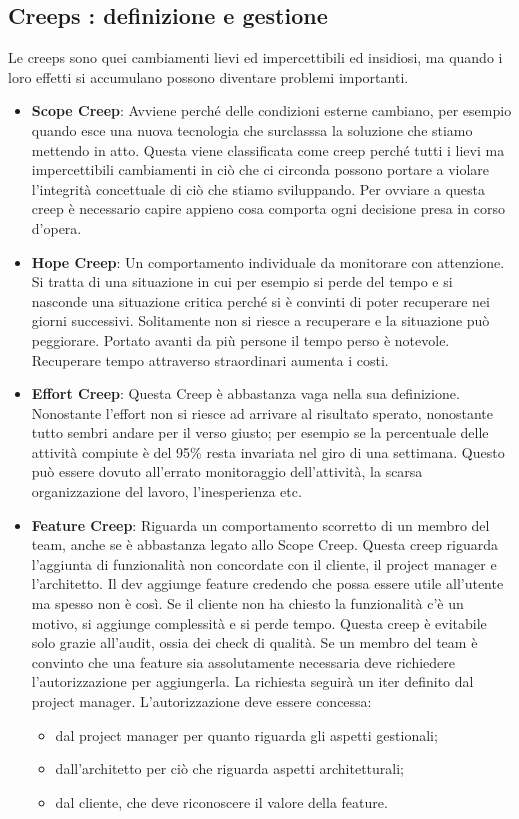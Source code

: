 \subsection{Creeps : definizione e gestione}
Le creeps sono quei cambiamenti lievi ed impercettibili ed insidiosi, ma quando i loro effetti si accumulano possono diventare problemi importanti.
\begin{itemize}
	\item \textbf{Scope Creep}: Avviene perché delle condizioni esterne cambiano, per esempio quando esce una nuova tecnologia che surclasssa la soluzione che stiamo mettendo in atto. Questa viene classificata come creep perché tutti i lievi ma impercettibili cambiamenti in ciò che ci circonda possono portare a violare l'integrità concettuale di ciò che stiamo sviluppando. Per ovviare a questa creep è necessario capire appieno cosa comporta ogni decisione presa in corso d'opera.
	\item \textbf{Hope Creep}: Un comportamento individuale da monitorare con attenzione. Si tratta di una situazione in cui per esempio si perde del tempo e si nasconde una situazione critica perché si è convinti di poter recuperare nei giorni successivi. Solitamente non si riesce a recuperare e la situazione può peggiorare. Portato avanti da più persone il tempo perso è notevole. Recuperare tempo attraverso straordinari aumenta i costi.
	\item \textbf{Effort Creep}: Questa Creep è abbastanza vaga nella sua definizione. Nonostante l'effort non si riesce ad arrivare al risultato sperato, nonostante tutto sembri andare per il verso giusto; per esempio se la percentuale delle attività compiute è del 95\% resta invariata nel giro di una settimana. Questo può essere dovuto all'errato monitoraggio dell'attività, la scarsa organizzazione del lavoro, l'inesperienza etc.
	\item \textbf{Feature Creep}: Riguarda un comportamento scorretto di un membro del team, anche se è abbastanza legato allo Scope Creep. Questa creep riguarda l'aggiunta di funzionalità non concordate con il cliente, il project manager e l'architetto. Il dev aggiunge feature credendo che possa essere utile all'utente ma spesso non è così. Se il cliente non ha chiesto la funzionalità c'è un motivo, si aggiunge complessità e si perde tempo. Questa creep è evitabile solo grazie all'audit, ossia dei check di qualità.\newline
	Se un membro del team è convinto che una feature sia assolutamente necessaria deve richiedere l'autorizzazione per aggiungerla. La richiesta seguirà un iter definito dal project manager. L'autorizzazione deve essere concessa:
	\begin{itemize}
		\item dal project manager per quanto riguarda gli aspetti gestionali;
		\item dall'architetto per ciò che riguarda aspetti architetturali;
		\item dal cliente, che deve riconoscere il valore della feature.
	\end{itemize}
\end{itemize}
